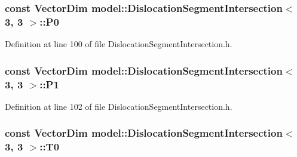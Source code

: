 \hypertarget{classmodel_1_1_dislocation_segment_intersection_3_013_00_013_01_4_a79f578b701556b2eb0fb3a91a4e3abe0}{}
\subsubsection[{P0}]{\setlength{\rightskip}{0pt plus 5cm}const Vector\+Dim {\bf model\+::\+Dislocation\+Segment\+Intersection}$<$ 3, 3 $>$\+::P0}\label{classmodel_1_1_dislocation_segment_intersection_3_013_00_013_01_4_a79f578b701556b2eb0fb3a91a4e3abe0}


Definition at line 100 of file Dislocation\+Segment\+Intersection.\+h.

\hypertarget{classmodel_1_1_dislocation_segment_intersection_3_013_00_013_01_4_a796f0d5a198e8eec0ac22b8afdc29e02}{}
\subsubsection[{P1}]{\setlength{\rightskip}{0pt plus 5cm}const Vector\+Dim {\bf model\+::\+Dislocation\+Segment\+Intersection}$<$ 3, 3 $>$\+::P1}\label{classmodel_1_1_dislocation_segment_intersection_3_013_00_013_01_4_a796f0d5a198e8eec0ac22b8afdc29e02}


Definition at line 102 of file Dislocation\+Segment\+Intersection.\+h.

\hypertarget{classmodel_1_1_dislocation_segment_intersection_3_013_00_013_01_4_a3cfe99bfce53d3018023cbbf54f00ed7}{}
\subsubsection[{T0}]{\setlength{\rightskip}{0pt plus 5cm}const Vector\+Dim {\bf model\+::\+Dislocation\+Segment\+Intersection}$<$ 3, 3 $>$\+::T0}\label{classmodel_1_1_dislocation_segment_intersection_3_013_00_013_01_4_a3cfe99bfce53d3018023cbbf54f00ed7}


